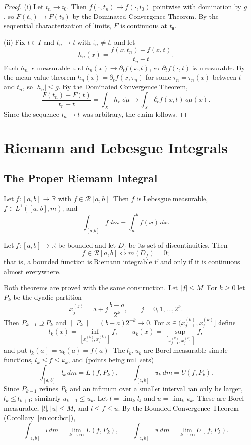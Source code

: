 \documentclass[11pt]{article}
\makeatletter
\newcommand{\envlabel}[1]{\protected@edef\@currentlabel{\themathenv}\label{#1}}
\makeatother
\begin{document}
\begin{proof}
(i) Let $t_{n}\to t_{0}$. Then $f(\cdot,t_{n})\to f(\cdot,t_{0})$ pointwise with domination by $g$, so $F(t_{n})\to F(t_{0})$ by the Dominated Convergence Theorem. By the sequential characterization of limits, $F$ is continuous at $t_{0}$.

(ii) Fix $t\in I$ and $t_{n}\to t$ with $t_{n}\neq t$, and let
\[
h_{n}(x)=\frac{f(x,t_{n})-f(x,t)}{t_{n}-t}.
\]
Each $h_{n}$ is measurable and $h_{n}(x)\to\partial_{t}f(x,t)$, so $\partial_{t}f(\cdot,t)$ is measurable. By the mean value theorem $h_{n}(x)=\partial_{t}f(x,\tau_{n})$ for some $\tau_{n}=\tau_{n}(x)$ between $t$ and $t_{n}$, so $|h_{n}|\leq g$. By the Dominated Convergence Theorem,
\[
\frac{F(t_{n})-F(t)}{t_{n}-t}=\int_{X}h_{n}\,d\mu\to\int_{X}\partial_{t}f(x,t)\,d\mu(x).
\]
Since the sequence $t_{n}\to t$ was arbitrary, the claim follows.
\end{proof}

\section{Riemann and Lebesgue Integrals}

\subsection{The Proper Riemann Integral}

\begin{theorem}\envlabel{en:thm:RL}
Let $f:[a,b]\to\mathbb{R}$ with $f\in\mathcal{R}[a,b]$. Then $f$ is Lebesgue measurable, $f\in L^{1}([a,b],m)$, and
\[
\int_{[a,b]}f\,dm=\int_{a}^{b}f(x)\,dx.
\]
\end{theorem}

\begin{theorem}\envlabel{en:thm:criterion}
Let $f:[a,b]\to\mathbb{R}$ be bounded and let $D_{f}$ be its set of discontinuities. Then
\[
f\in\mathcal{R}[a,b]\iff m(D_{f})=0;
\]
that is, a bounded function is Riemann integrable if and only if it is continuous almost everywhere.
\end{theorem}

Both theorems are proved with the same construction. Let $|f|\leq M$. For $k\geq0$ let $P_{k}$ be the dyadic partition
\[
x_{j}^{(k)}=a+j\,\frac{b-a}{2^{k}},\qquad j=0,1,\ldots,2^{k}.
\]
Then $P_{k+1}\supseteq P_{k}$ and $\|P_{k}\|=(b-a)2^{-k}\to0$. For $x\in(x_{j-1}^{(k)},x_{j}^{(k)}]$ define
\[
l_{k}(x)=\inf_{[x_{j-1}^{(k)},x_{j}^{(k)}]}f,\qquad u_{k}(x)=\sup_{[x_{j-1}^{(k)},x_{j}^{(k)}]}f,
\]
and put $l_{k}(a)=u_{k}(a)=f(a)$. The $l_{k},u_{k}$ are Borel measurable simple functions, $l_{k}\leq f\leq u_{k}$, and (points being null sets)
\[
\int_{[a,b]}l_{k}\,dm=L(f,P_{k}),\qquad\int_{[a,b]}u_{k}\,dm=U(f,P_{k}).
\]
Since $P_{k+1}$ refines $P_{k}$ and an infimum over a smaller interval can only be larger, $l_{k}\leq l_{k+1}$; similarly $u_{k+1}\leq u_{k}$. Let $l=\lim_{k}l_{k}$ and $u=\lim_{k}u_{k}$. These are Borel measurable, $|l|,|u|\leq M$, and $l\leq f\leq u$. By the Bounded Convergence Theorem (Corollary~\ref{en:cor:bct}),
\[
\int_{[a,b]}l\,dm=\lim_{k\to\infty}L(f,P_{k}),\qquad\int_{[a,b]}u\,dm=\lim_{k\to\infty}U(f,P_{k}).\tag{$\ast$}
\]
\end{document}
